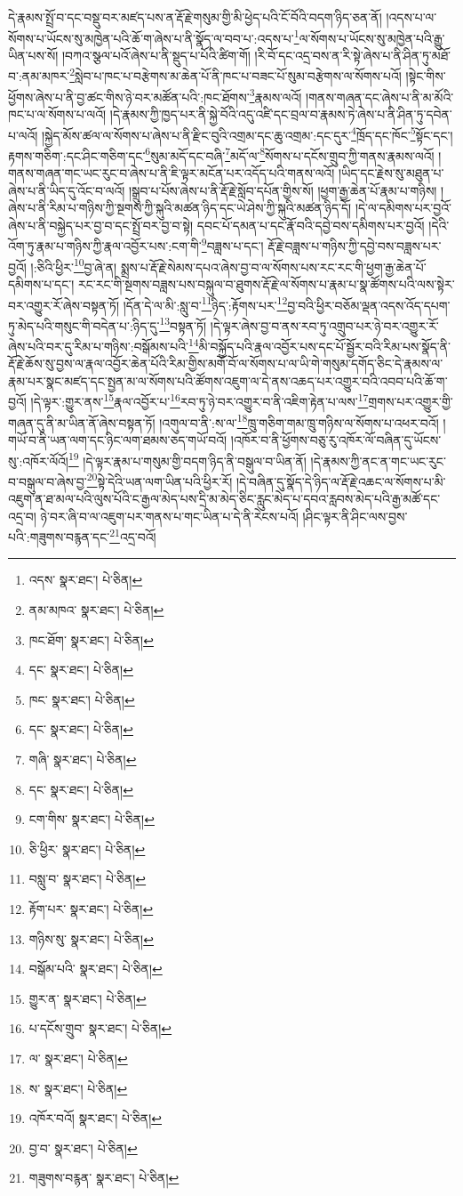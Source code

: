 དེ་རྣམས་སྤྲོ་བ་དང་བསྡུ་བར་མཛད་པས་ན་རྡོ་རྗེ་གསུམ་གྱི་མི་ཕྱེད་པའི་ངོ་བོའི་བདག་ཉིད་ཅན་ནོ། །འདས་པ་ལ་སོགས་པ་ཡོངས་སུ་མཁྱེན་པའི་ཆོ་ག་ཞེས་པ་ནི་སྣོད་ལ་བབ་པ་:འདས་པ་\footnote{འདས་  སྣར་ཐང་།  པེ་ཅིན། }ལ་སོགས་པ་ཡོངས་སུ་མཁྱེན་པའི་རྒྱུ་ཡིན་པས་སོ། །བཀའ་སྩལ་པའོ་ཞེས་པ་ནི་སྡུད་པ་པོའི་ཚིག་གོ། །རི་བོ་དང་འདྲ་བས་ན་རི་སྟེ་ཞེས་པ་ནི་ཤིན་ཏུ་མཐོ་བ་:ནམ་མཁར་\footnote{ནམ་མཁའ་  སྣར་ཐང་།  པེ་ཅིན། }སླེབ་པ་ཁང་པ་བརྩེགས་མ་ཆེན་པོ་ནི་ཁང་པ་བཟང་པོ་སུམ་བརྩེགས་ལ་སོགས་པའོ། །སྟེང་གིས་ཕྱོགས་ཞེས་པ་ནི་བྱ་ཚང་གིས་ཉེ་བར་མཚོན་པའི་:ཁང་ཐོགས་\footnote{ཁང་ཐོག་  སྣར་ཐང་།  པེ་ཅིན། }རྣམས་ལའོ། །གནས་གཞན་དང་ཞེས་པ་ནི་མ་མོའི་ཁང་པ་ལ་སོགས་པ་ལའོ། །དེ་རྣམས་ཀྱི་ཁྱད་པར་ནི་སྐྱེ་བོའི་འདུ་འཛི་དང་བྲལ་བ་རྣམས་ཏེ་ཞེས་པ་ནི་ཤིན་ཏུ་དབེན་པ་ལའོ། །སྐྱེད་མོས་ཚལ་ལ་སོགས་པ་ཞེས་པ་ནི་རྫིང་བུའི་འགྲམ་དང་ཆུ་འགྲམ་:དང་དུར་\footnote{དང་  སྣར་ཐང་།  པེ་ཅིན། }ཁྲོད་དང་ཁོང་\footnote{ཁང་  སྣར་ཐང་།  པེ་ཅིན། }སྟོང་དང་། རྟགས་གཅིག་:དང་ཤིང་གཅིག་དང་\footnote{དང་  སྣར་ཐང་།  པེ་ཅིན། }སུམ་མདོ་དང་བཞི་\footnote{གཞི་  སྣར་ཐང་།  པེ་ཅིན། }མདོ་ལ་\footnote{དང་  སྣར་ཐང་།  པེ་ཅིན། }སོགས་པ་དངོས་གྲུབ་ཀྱི་གནས་རྣམས་ལའོ། །གནས་གཞན་གང་ཡང་རུང་བ་ཞེས་པ་ནི་ཇི་ལྟར་མངོན་པར་འདོད་པའི་གནས་ལའོ། །ཡིད་དང་རྗེས་སུ་མཐུན་པ་ཞེས་པ་ནི་ཡིད་དུ་འོང་བ་ལའོ། །སྒྲུབ་པ་པོས་ཞེས་པ་ནི་རྡོ་རྗེ་སློབ་དཔོན་གྱིས་སོ། །ཕྱག་རྒྱ་ཆེན་པོ་རྣམ་པ་གཉིས། །ཞེས་པ་ནི་རིམ་པ་གཉིས་ཀྱི་སྔགས་ཀྱི་སྐུའི་མཚན་ཉིད་དང་ཡེ་ཤེས་ཀྱི་སྐུའི་མཚན་ཉིད་དོ། །དེ་ལ་དམིགས་པར་བྱའོ་ཞེས་པ་ནི་བསྐྱེད་པར་བྱ་བ་དང་སྤྲོ་བར་བྱ་བ་སྟེ། དབང་པོ་དམན་པ་དང་རྣོ་བའི་དབྱེ་བས་དམིགས་པར་བྱའོ། །དེའི་འོག་ཏུ་རྣམ་པ་གཉིས་ཀྱི་རྣལ་འབྱོར་པས་:ངག་གི་\footnote{ངག་གིས་  སྣར་ཐང་།  པེ་ཅིན། }བཟླས་པ་དང་། རྡོ་རྗེ་བཟླས་པ་གཉིས་ཀྱི་དབྱེ་བས་བཟླས་པར་བྱའོ། །:ཅིའི་ཕྱིར་\footnote{ཅི་ཕྱིར་  སྣར་ཐང་།  པེ་ཅིན། }བྱ་ཞེ་ན། སྨྲས་པ་རྡོ་རྗེ་སེམས་དཔའ་ཞེས་བྱ་བ་ལ་སོགས་པས་རང་རང་གི་ཕྱག་རྒྱ་ཆེན་པོ་དམིགས་པ་དང་། རང་རང་གི་སྔགས་བཟླས་པས་བསྐུལ་བ་ཐུགས་རྡོ་རྗེ་ལ་སོགས་པ་རྣམ་པ་སྣ་ཚོགས་པའི་ལས་སྟེར་བར་འགྱུར་རོ་ཞེས་བསྟན་ཏོ། །དོན་དེ་ལ་མི་:སླུ་བ་\footnote{བསླུ་བ་  སྣར་ཐང་།  པེ་ཅིན། }ཉིད་:རྟོགས་པར་\footnote{རྟོག་པར་  སྣར་ཐང་།  པེ་ཅིན། }བྱ་བའི་ཕྱིར་བཅོམ་ལྡན་འདས་འོད་དཔག་ཏུ་མེད་པའི་གསུང་གི་བདེན་པ་:ཉིད་དུ་\footnote{གཉིས་སུ་  སྣར་ཐང་།  པེ་ཅིན། }བསྟན་ཏོ། །དེ་ལྟར་ཞེས་བྱ་བ་ནས་རབ་ཏུ་འགྲུབ་པར་ཉེ་བར་འགྱུར་རོ་ཞེས་པའི་བར་དུ་རིམ་པ་གཉིས་:བསྒོམས་པའི་\footnote{བསྒོམ་པའི་  སྣར་ཐང་།  པེ་ཅིན། }མི་བསྐྱོད་པའི་རྣལ་འབྱོར་པས་དང་པོ་སྦྱོར་བའི་རིམ་པས་སྣོད་ནི་རྡོ་རྗེ་ཆོས་སུ་བྱས་ལ་རྣལ་འབྱོར་ཆེན་པོའི་རིམ་གྱིས་མགོ་བོ་ལ་སོགས་པ་ལ་ཡི་གེ་གསུམ་དགོད་ཅིང་དེ་རྣམས་ལ་རྣམ་པར་སྣང་མཛད་དང་སྤྱན་མ་ལ་སོགས་པའི་ཚོགས་འཇུག་ལ་དེ་ནས་འཆད་པར་འགྱུར་བའི་འབབ་པའི་ཆོ་ག་བྱའོ། །དེ་ལྟར་:གྱུར་ནས་\footnote{གྱུར་ན་  སྣར་ཐང་།  པེ་ཅིན། }རྣལ་འབྱོར་པ་\footnote{པ་དངོས་གྲུབ་  སྣར་ཐང་།  པེ་ཅིན། }རབ་ཏུ་ཉེ་བར་འགྱུར་བ་ནི་འཇིག་རྟེན་པ་ལས་\footnote{ལ་  སྣར་ཐང་།  པེ་ཅིན། }གྲགས་པར་འགྱུར་གྱི་གཞན་དུ་ནི་མ་ཡིན་ནོ་ཞེས་བསྟན་ཏོ། །འགུལ་བ་ནི་:ས་ལ་\footnote{ས་  སྣར་ཐང་།  པེ་ཅིན། }ཁྲུ་གཅིག་གམ་ཁྲུ་གཉིས་ལ་སོགས་པ་འཕར་བའོ། །གཡོ་བ་ནི་ཡན་ལག་དང་ཉིང་ལག་ཐམས་ཅད་གཡོ་བའོ། །འཁོར་བ་ནི་ཕྱོགས་བཅུ་རུ་འཁོར་ལོ་བཞིན་དུ་ཡོངས་སུ་:འཁོར་ལོའོ།\footnote{འཁོར་བའོ།  སྣར་ཐང་།  པེ་ཅིན། } །དེ་ལྟར་རྣམ་པ་གསུམ་གྱི་བདག་ཉིད་ནི་བསྒུལ་བ་ཡིན་ནོ། །དེ་རྣམས་ཀྱི་ནང་ན་གང་ཡང་རུང་བ་བསྒུལ་བ་ཞེས་བྱ་\footnote{བྱ་བ་  སྣར་ཐང་།  པེ་ཅིན། }སྟེ་དེའི་ཡན་ལག་ཡིན་པའི་ཕྱིར་རོ། །དེ་བཞིན་དུ་སྣོད་དེ་ཉིད་ལ་རྡོ་རྗེ་འཆང་ལ་སོགས་པ་མི་འཇུག་ན་ཐ་མལ་པའི་ལུས་པོའི་ང་རྒྱལ་མེད་པས་དྲི་མ་མེད་ཅིང་རླུང་མེད་པ་དབའ་རླབས་མེད་པའི་རྒྱ་མཚོ་དང་འདྲ་བ། ཉེ་བར་ཞི་བ་ལ་འཇུག་པར་གནས་པ་གང་ཡིན་པ་དེ་ནི་རེངས་པའོ། །ཤིང་ལྟར་ནི་ཤིང་ལས་བྱས་པའི་:གཟུགས་བརྙན་དང་\footnote{གཟུགས་བརྙན་  སྣར་ཐང་།  པེ་ཅིན། }འདྲ་བའོ། 